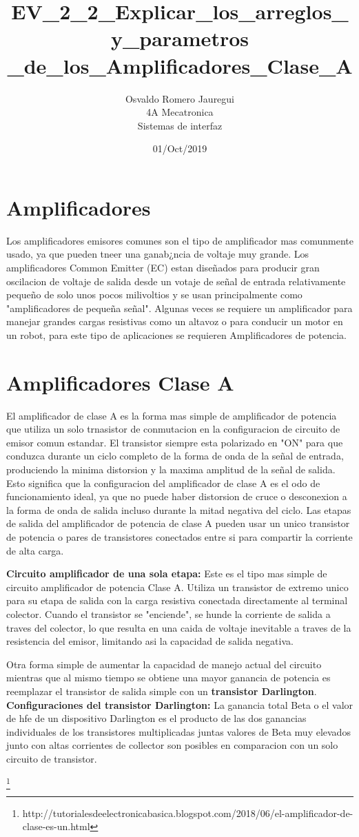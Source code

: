 \documentclass[12pt]{article}
\title{\textbf{EV\_2\_2\_Explicar\_los\_arreglos\_y\_parametros
\_de\_los\_Amplificadores\_Clase\_A}}
\author{Osvaldo Romero Jauregui\\
		4A Mecatronica\\
		Sistemas de interfaz}
\date{01/Oct/2019}
\begin{document}
\maketitle

\section{Amplificadores}
Los amplificadores emisores comunes son el tipo de amplificador mas comunmente usado, ya que pueden tneer una ganab¿ncia de voltaje muy grande.
Los amplificadores Common Emitter (EC) estan diseñados para producir gran oscilacion de voltaje de salida desde un votaje de señal de entrada relativamente pequeño de solo unos pocos milivoltios y se usan principalmente como "amplificadores de pequeña señal".
Algunas veces se requiere un amplificador para manejar grandes cargas resistivas como un altavoz o para conducir un motor en un robot, para este tipo de aplicaciones se requieren Amplificadores de potencia.




\section{Amplificadores Clase A}
El amplificador de clase A es la forma mas simple de amplificador de potencia que utiliza un solo trnasistor de conmutacion en la configuracion de circuito de emisor comun estandar. El transistor siempre esta polarizado en "ON" para que conduzca durante un ciclo completo de la forma de onda de la señal de entrada, produciendo la minima distorsion y la maxima amplitud de la señal de salida.
Esto significa que la configuracion del amplificador de clase A es el odo de funcionamiento ideal, ya que no puede haber distorsion de cruce o desconexion a la forma de onda de salida incluso durante la mitad negativa del ciclo. Las etapas de salida del amplificador de potencia de clase A pueden usar un unico transistor de potencia o pares de transistores conectados entre si para compartir la corriente de alta carga.

\textbf{Circuito amplificador de una sola etapa:} Este es el tipo mas simple de circuito amplificador de potencia Clase A. Utiliza un transistor de extremo unico para su etapa de salida con la carga resistiva conectada directamente al terminal colector. Cuando el transistor se "enciende", se hunde la corriente de salida a traves del colector, lo que resulta en una caida de voltaje inevitable a traves de la resistencia del emisor, limitando asi la capacidad de salida negativa.
 
Otra forma simple de aumentar la capacidad de manejo actual del circuito mientras que al mismo tiempo se obtiene una mayor ganancia de potencia es reemplazar el transistor de salida simple con un \textbf{transistor Darlington}. 
\textbf{Configuraciones del transistor Darlington:} La ganancia total Beta o el valor de hfe de un dispositivo Darlington es el producto de las dos ganancias individuales de los transistores multiplicadas juntas  valores de Beta muy elevados junto con altas corrientes de collector son posibles en comparacion con un solo circuito de transistor.
 

\footnote{http://tutorialesdeelectronicabasica.blogspot.com/2018/06/el-amplificador-de-clase-es-un.html}
\end{document}
